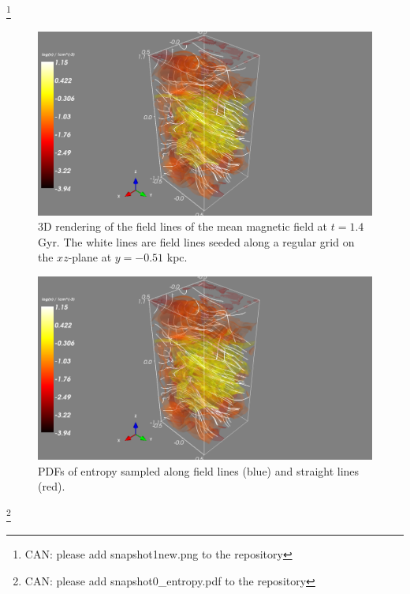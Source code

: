 \documentclass[useAMS,usenatbib]{mn2e}
\begin{document}
\footnote{CAN: please add snapshot1new.png to the repository}
\begin{figure}
  \vspace{0cm}
  \centering
\hspace*{0cm} \includegraphics[scale=0.35]{fig/snapshot1.png}
\hspace*{0cm} \caption{3D rendering of the field lines of the mean magnetic field at $t = 1.4$ Gyr. The white lines are field lines seeded along a regular grid on the $xz$-plane at $y=-0.51$ kpc. 
  \label{fig:fld_lines}}
  \end{figure}
\begin{figure}
\centering 
\includegraphics[width=\linewidth]{fig/snapshot1.png}
\caption{PDFs of entropy sampled along field lines (blue) and straight lines (red).}
\label{fig:pdfs_mean}
\end{figure} 
\footnote{CAN: please add snapshot0\_entropy.pdf to the repository} 
\end{document}
